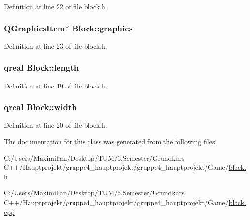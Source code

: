 Definition at line 22 of file block.\+h.

\subsubsection[{\texorpdfstring{graphics}{graphics}}]{\setlength{\rightskip}{0pt plus 5cm}Q\+Graphics\+Item$\ast$ Block\+::graphics}\hypertarget{class_block_aab0690c05a4c1c8ee999647250b3e170}{}\label{class_block_aab0690c05a4c1c8ee999647250b3e170}


Definition at line 23 of file block.\+h.

\subsubsection[{\texorpdfstring{length}{length}}]{\setlength{\rightskip}{0pt plus 5cm}qreal Block\+::length}\hypertarget{class_block_a7ad40ed8c8d961b1ca2117835853a9c5}{}\label{class_block_a7ad40ed8c8d961b1ca2117835853a9c5}


Definition at line 19 of file block.\+h.

\subsubsection[{\texorpdfstring{width}{width}}]{\setlength{\rightskip}{0pt plus 5cm}qreal Block\+::width}\hypertarget{class_block_af7693d02f586bf02df6181995a66b768}{}\label{class_block_af7693d02f586bf02df6181995a66b768}


Definition at line 20 of file block.\+h.



The documentation for this class was generated from the following files\+:\begin{DoxyCompactItemize}
\item 
C\+:/\+Users/\+Maximilian/\+Desktop/\+T\+U\+M/6.\+Semester/\+Grundkurs C++/\+Hauptprojekt/gruppe4\+\_\+hauptprojekt/gruppe4\+\_\+hauptprojekt/\+Game/\hyperlink{block_8h}{block.\+h}\item 
C\+:/\+Users/\+Maximilian/\+Desktop/\+T\+U\+M/6.\+Semester/\+Grundkurs C++/\+Hauptprojekt/gruppe4\+\_\+hauptprojekt/gruppe4\+\_\+hauptprojekt/\+Game/\hyperlink{block_8cpp}{block.\+cpp}\end{DoxyCompactItemize}
